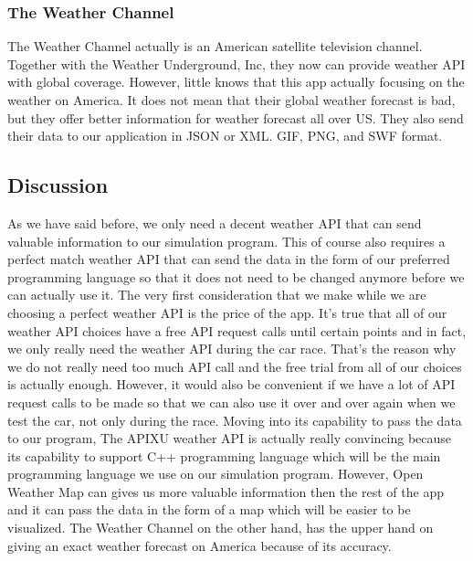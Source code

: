 \documentclass[onecolumn, draftclsnofoot,10pt, compsoc]{IEEEtran}
\begin{document}
\begin{singlespace}
\subsubsection{The Weather Channel }
The Weather Channel actually is an American satellite television channel. Together with the Weather Underground, Inc, they now can provide weather API with global coverage. However, little knows that this app actually focusing on the weather on America. It does not mean that their global weather forecast is bad, but they offer better information for weather forecast all over US. They also send their data to our application in JSON or XML. GIF, PNG, and SWF format. 

\subsection{Discussion}
As we have said before, we only need a decent weather API that can send valuable information to our simulation program. This of course also requires a perfect match weather API that can send the data in the form of our preferred programming language so that it does not need to be changed anymore before we can actually use it. The very first consideration that we make while we are choosing a perfect weather API is the price of the app. It’s true that all of our weather API choices have a free API request calls until certain points and in fact, we only really need the weather API during the car race. That’s the reason why we do not really need too much API call and the free trial from all of our choices is actually enough. However, it would also be convenient if we have a lot of API request calls to be made so that we can also use it over and over again when we test the car, not only during the race. Moving into its capability to pass the data to our program, The APIXU weather API is actually really convincing because its capability to support C++ programming language which will be the main programming language we use on our simulation program. However, Open Weather Map can gives us more valuable information then the rest of the app and it can pass the data in the form of a map which will be easier to be visualized. The Weather Channel on the other hand, has the upper hand on giving an exact weather forecast on America because of its accuracy. 



\end{singlespace}
\end{document}
